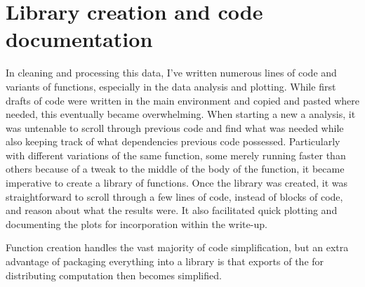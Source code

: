 
\chapter*{Library creation and code documentation}

\par In cleaning and processing this data, I’ve written numerous lines of code and variants of functions, especially in the data analysis and plotting.  While first drafts of code were written in the main environment and copied and pasted where needed, this eventually became overwhelming.  When starting a new a analysis, it was untenable to scroll through previous code and find what was needed while also keeping track of what dependencies previous code possessed.  Particularly with different variations of the same function, some merely running faster than others because of a tweak to the middle of the body of the function, it became imperative to create a library of functions.  Once the library was created, it was straightforward to scroll through a few lines of code, instead of blocks of code, and reason about what the results were.  It also facilitated quick plotting and documenting the plots for incorporation within the write-up.

\par Function creation handles the vast majority of code simplification, but an extra advantage of packaging everything into a library is that exports of the for distributing computation then becomes simplified.
